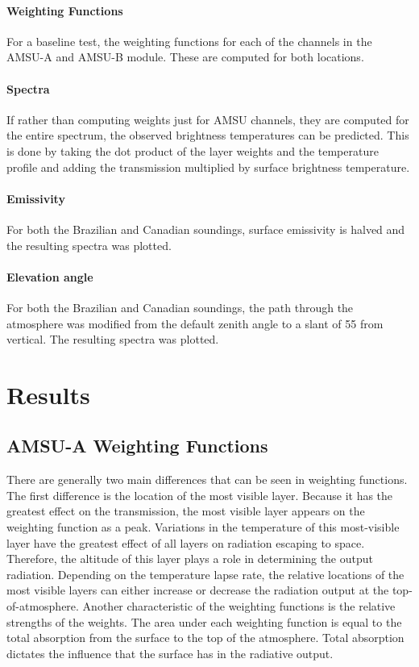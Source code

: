 \documentclass[twocol]{ametsoc}
\begin{document}
\paragraph{Weighting Functions }

For a baseline test, the weighting functions for each of the channels in the AMSU-A and AMSU-B module.
These are computed for both locations.

\paragraph{Spectra}

If rather than computing weights just for AMSU channels, they are computed for the entire spectrum, the observed brightness temperatures can be predicted.
This is done by taking the dot product of the layer weights and the temperature profile and adding the transmission multiplied by surface brightness temperature.

\paragraph{Emissivity}
For both the Brazilian and Canadian soundings, surface emissivity is halved and the resulting spectra was plotted.

\paragraph{Elevation angle}
For both the Brazilian and Canadian soundings, the path through the atmosphere was modified from the default zenith angle to a slant of 55\degree{} from vertical.
The resulting spectra was plotted.

\section{Results}

\subsection{AMSU-A Weighting Functions}

There are generally two main differences that can be seen in weighting functions.
The first difference is the location of the most visible layer.
Because it has the greatest effect on the transmission, the most visible layer appears on the weighting function as a peak.
Variations in the temperature of this most-visible layer have the greatest effect of all layers on radiation escaping to space.
Therefore, the altitude of this layer plays a role in determining the output radiation.
Depending on the temperature lapse rate, the relative locations of the most visible layers can either increase or decrease the radiation output at the top-of-atmosphere.
Another characteristic of the weighting functions is the relative strengths of the weights.
The area under each weighting function is equal to the total absorption from the surface to the top of the atmosphere.
Total absorption dictates the influence that the surface has in the radiative output.
\end{document}
